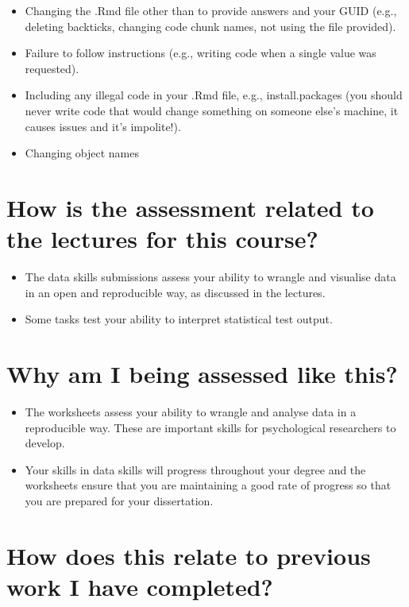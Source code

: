 \documentclass[
  english,
  letterpaper,
  DIV=11,
  numbers=noendperiod]{scrreprt}
\begin{document}
\begin{itemize}
\item
  Changing the .Rmd file other than to provide answers and your GUID
  (e.g., deleting backticks, changing code chunk names, not using the
  file provided).
\item
  Failure to follow instructions (e.g., writing code when a single value
  was requested).
\item
  Including any illegal code in your .Rmd file, e.g., install.packages
  (you should never write code that would change something on someone
  else's machine, it causes issues and it's impolite!).
\item
  Changing object names
\end{itemize}

\section{How is the assessment related to the lectures for this
course?}\label{how-is-the-assessment-related-to-the-lectures-for-this-course}

\begin{itemize}
\item
  The data skills submissions assess your ability to wrangle and
  visualise data in an open and reproducible way, as discussed in the
  lectures.
\item
  Some tasks test your ability to interpret statistical test output.
\end{itemize}

\section{Why am I being assessed like
this?}\label{why-am-i-being-assessed-like-this}

\begin{itemize}
\item
  The worksheets assess your ability to wrangle and analyse data in a
  reproducible way. These are important skills for psychological
  researchers to develop.
\item
  Your skills in data skills will progress throughout your degree and
  the worksheets ensure that you are maintaining a good rate of progress
  so that you are prepared for your dissertation.
\end{itemize}

\section{How does this relate to previous work I have
completed?}\label{how-does-this-relate-to-previous-work-i-have-completed}
\end{document}

